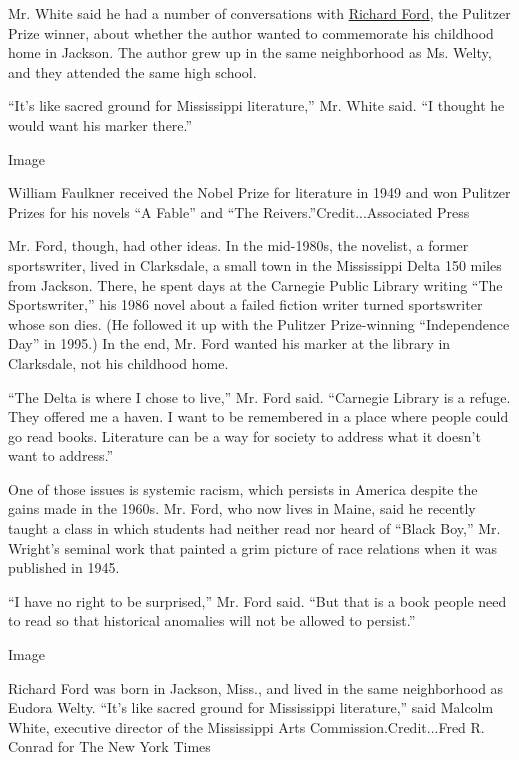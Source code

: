 Mr. White said he had a number of conversations with
\href{https://www.nytimes3xbfgragh.onion/2012/06/24/books/review/richard-ford-by-the-book.html}{Richard
Ford}, the Pulitzer Prize winner, about whether the author wanted to
commemorate his childhood home in Jackson. The author grew up in the
same neighborhood as Ms. Welty, and they attended the same high school.

``It's like sacred ground for Mississippi literature,'' Mr. White said.
``I thought he would want his marker there.''

Image

William Faulkner received the Nobel Prize for literature in 1949 and won
Pulitzer Prizes for his novels ``A Fable'' and ``The
Reivers.''Credit...Associated Press

Mr. Ford, though, had other ideas. In the mid-1980s, the novelist, a
former sportswriter, lived in Clarksdale, a small town in the
Mississippi Delta 150 miles from Jackson. There, he spent days at the
Carnegie Public Library writing ``The Sportswriter,'' his 1986 novel
about a failed fiction writer turned sportswriter whose son dies. (He
followed it up with the Pulitzer Prize-winning ``Independence Day'' in
1995.) In the end, Mr. Ford wanted his marker at the library in
Clarksdale, not his childhood home.

``The Delta is where I chose to live,'' Mr. Ford said. ``Carnegie
Library is a refuge. They offered me a haven. I want to be remembered in
a place where people could go read books. Literature can be a way for
society to address what it doesn't want to address.''

One of those issues is systemic racism, which persists in America
despite the gains made in the 1960s. Mr. Ford, who now lives in Maine,
said he recently taught a class in which students had neither read nor
heard of ``Black Boy,'' Mr. Wright's seminal work that painted a grim
picture of race relations when it was published in 1945.

``I have no right to be surprised,'' Mr. Ford said. ``But that is a book
people need to read so that historical anomalies will not be allowed to
persist.''

Image

Richard Ford was born in Jackson, Miss., and lived in the same
neighborhood as Eudora Welty. ``It's like sacred ground for Mississippi
literature,'' said Malcolm White, executive director of the Mississippi
Arts Commission.Credit...Fred R. Conrad for The New York Times


